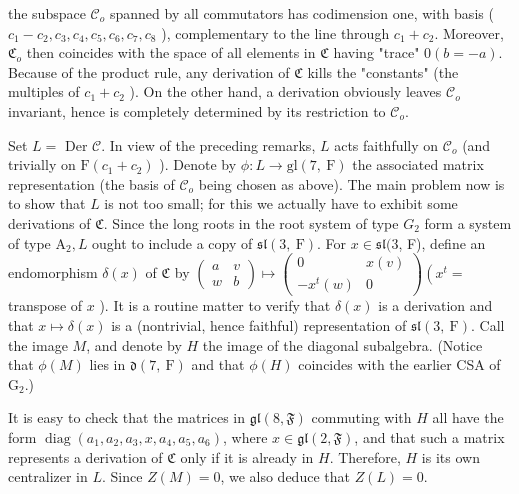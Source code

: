 \documentclass[10pt]{article}
\begin{document}
the subspace $\mathcal{C}_{o}$ spanned by all commutators has codimension one, with basis ( $c_{1}-c_{2}, c_{3}, c_{4}, c_{5}, c_{6}, c_{7}, c_{8}$ ), complementary to the line through $c_{1}+c_{2}$. Moreover, $\mathfrak{C}_{o}$ then coincides with the space of all elements in $\mathfrak{C}$ having "trace" $0(b=-a)$. Because of the product rule, any derivation of $\mathfrak{C}$ kills the "constants" (the multiples of $c_{1}+c_{2}$ ). On the other hand, a derivation obviously leaves $\mathcal{C}_{o}$ invariant, hence is completely determined by its restriction to $\mathcal{C}_{o}$.

Set $L=$ Der $\mathcal{C}$. In view of the preceding remarks, $L$ acts faithfully on $\mathcal{C}_{o}$ (and trivially on $\mathrm{F}\left(c_{1}+c_{2}\right)$ ). Denote by $\phi: L \rightarrow \mathrm{gl}(7, \mathrm{~F})$ the associated matrix representation (the basis of $\mathcal{C}_{o}$ being chosen as above). The main problem now is to show that $L$ is not too small; for this we actually have to exhibit some derivations of $\mathfrak{C}$. Since the long roots in the root system of type $G_{2}$ form a system of type $\mathrm{A}_{2}, L$ ought to include a copy of $\mathfrak{s l}(3, \mathrm{~F})$. For $x \in \mathfrak{s l}(3$, F), define an endomorphism $\delta(x)$ of $\mathfrak{C}$ by $\left(\begin{array}{ll}a & v \\ w & b\end{array}\right) \mapsto\left(\begin{array}{cc}0 & x(v) \\ -x^{t}(w) & 0\end{array}\right)\left(x^{t}=\right.$ transpose of $x$ ). It is a routine matter to verify that $\delta(x)$ is a derivation and that $x \mapsto \delta(x)$ is a (nontrivial, hence faithful) representation of $\mathfrak{s l}(3, \mathrm{~F})$. Call the image $M$, and denote by $H$ the image of the diagonal subalgebra. (Notice that $\phi(M)$ lies in $\mathfrak{d}(7, \mathrm{~F})$ and that $\phi(H)$ coincides with the earlier CSA of $\mathrm{G}_{2}$.)

It is easy to check that the matrices in $\mathfrak{g l}(8, \mathfrak{F})$ commuting with $H$ all have the form $\operatorname{diag}\left(a_{1}, a_{2}, a_{3}, x, a_{4}, a_{5}, a_{6}\right)$, where $x \in \mathfrak{g l}(2, \mathfrak{F})$, and that such a matrix represents a derivation of $\mathfrak{C}$ only if it is already in $H$. Therefore, $H$ is its own centralizer in $L$. Since $Z(M)=0$, we also deduce that $Z(L)=0$.
\end{document}
